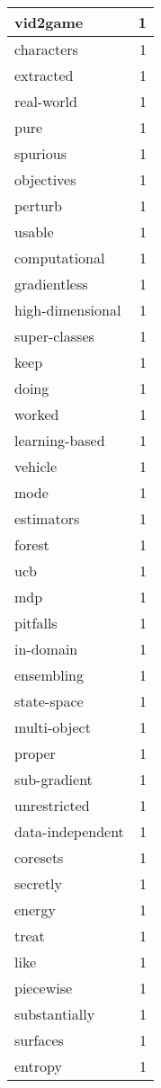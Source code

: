 \begin{table}[h]
\begin{tabular}{|l|r|}
\hline
vid2game & 1 \\
\hline
characters & 1 \\
\hline
extracted & 1 \\
\hline
real-world & 1 \\
\hline
pure & 1 \\
\hline
spurious & 1 \\
\hline
objectives & 1 \\
\hline
perturb & 1 \\
\hline
usable & 1 \\
\hline
computational & 1 \\
\hline
gradientless & 1 \\
\hline
high-dimensional & 1 \\
\hline
super-classes & 1 \\
\hline
keep & 1 \\
\hline
doing & 1 \\
\hline
worked & 1 \\
\hline
learning-based & 1 \\
\hline
vehicle & 1 \\
\hline
mode & 1 \\
\hline
estimators & 1 \\
\hline
forest & 1 \\
\hline
ucb & 1 \\
\hline
mdp & 1 \\
\hline
pitfalls & 1 \\
\hline
in-domain & 1 \\
\hline
ensembling & 1 \\
\hline
state-space & 1 \\
\hline
multi-object & 1 \\
\hline
proper & 1 \\
\hline
sub-gradient & 1 \\
\hline
unrestricted & 1 \\
\hline
data-independent & 1 \\
\hline
coresets & 1 \\
\hline
secretly & 1 \\
\hline
energy & 1 \\
\hline
treat & 1 \\
\hline
like & 1 \\
\hline
piecewise & 1 \\
\hline
substantially & 1 \\
\hline
surfaces & 1 \\
\hline
entropy & 1 \\

\end{tabular}
\end{table}
